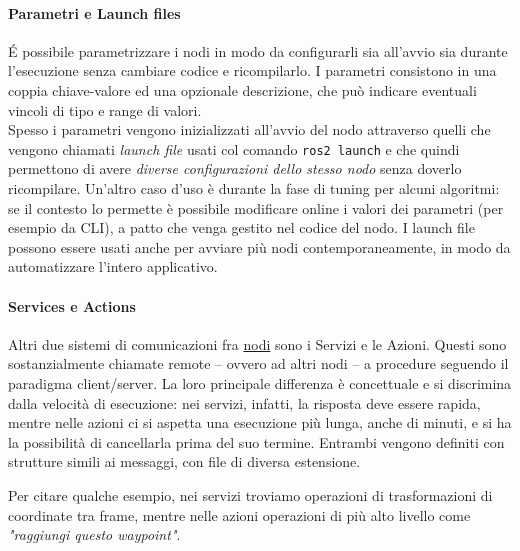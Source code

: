 \paragraph{Parametri e Launch files \cite{ros-params, ros-launch}}
É possibile parametrizzare i nodi in modo da configurarli sia all'avvio sia durante l'esecuzione
senza cambiare codice e ricompilarlo. I parametri consistono in una coppia chiave-valore ed una
opzionale descrizione, che può indicare eventuali vincoli di tipo e range di valori.\\
Spesso i parametri vengono inizializzati all'avvio del nodo attraverso quelli che vengono chiamati
\textit{launch file} usati col comando \verb|ros2 launch| e che quindi permettono di avere \textit{diverse
configurazioni dello stesso nodo} senza doverlo ricompilare. Un'altro caso d'uso è durante la fase di
tuning per alcuni algoritmi: se il contesto lo permette è possibile modificare online i valori dei
parametri (per esempio da CLI), a patto che venga gestito nel codice del nodo.
I launch file possono essere usati anche per avviare più nodi contemporaneamente, in modo da
automatizzare l'intero applicativo.

\paragraph{Services e Actions \cite{ros-services, ros-actions}}
\label{ros:srv-act}
Altri due sistemi di comunicazioni fra \hyperref[ros:nodes]{nodi} sono i Servizi e le Azioni.
Questi sono sostanzialmente chiamate remote -- ovvero ad altri nodi -- a procedure seguendo il paradigma
client/server. La loro principale differenza è concettuale e si discrimina dalla velocità di esecuzione:
nei servizi, infatti, la risposta deve essere rapida, mentre nelle azioni ci si aspetta una esecuzione
più lunga, anche di minuti, e si ha la possibilità di cancellarla prima del suo termine.
Entrambi vengono definiti con strutture simili ai messaggi, con file di diversa estensione.

Per citare qualche esempio, nei servizi troviamo operazioni di trasformazioni di coordinate tra frame, mentre
nelle azioni operazioni di più alto livello come \textit{"raggiungi questo waypoint"}.


\bigskip

